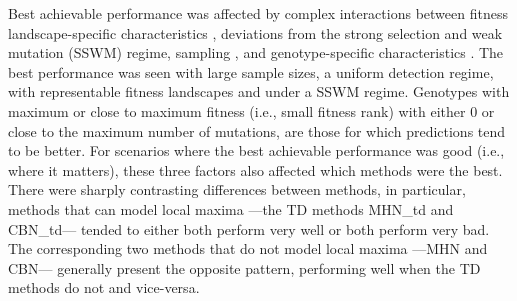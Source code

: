 \documentclass[a4paper,10pt]{article}
\begin{document}
Best achievable performance was affected by
complex interactions between fitness landscape-specific
characteristics%
, deviations from the
strong selection and weak mutation (SSWM) regime, sampling%
, and genotype-specific characteristics%
.  The
best performance was seen with large sample sizes, a uniform detection
regime, with representable fitness landscapes and under a SSWM
regime.  %
Genotypes with maximum or close to maximum fitness (i.e., small fitness
rank) with either 0 or close to the maximum number of mutations, are those
for which predictions tend to be better.  For scenarios where the best
achievable performance was good (i.e., where it matters), these three
factors also affected which methods were the best. There were sharply
contrasting differences between methods, in particular, methods
that can model local maxima ---the TD methods MHN\_td and CBN\_td--- tended to
either both
perform very well or both perform very bad. The corresponding two methods
that do not model local maxima ---MHN and CBN--- generally present the opposite
pattern, performing well when the TD methods do not and vice-versa.
\end{document}
